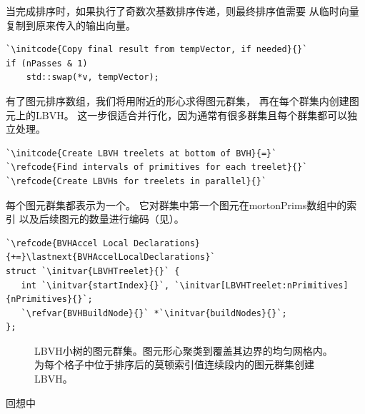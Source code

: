当完成排序时，如果执行了奇数次基数排序传递，则最终排序值需要
从临时向量复制到原来传入的输出向量。
\begin{lstlisting}
`\initcode{Copy final result from tempVector, if needed}{}`
if (nPasses & 1)
    std::swap(*v, tempVector);
\end{lstlisting}

有了图元排序数组，我们将用附近的形心求得图元群集，
再在每个群集内创建图元上的LBVH。
这一步很适合并行化，因为通常有很多群集且每个群集都可以独立处理。
\begin{lstlisting}
`\initcode{Create LBVH treelets at bottom of BVH}{=}`
`\refcode{Find intervals of primitives for each treelet}{}`
`\refcode{Create LBVHs for treelets in parallel}{}`
\end{lstlisting}

每个图元群集都表示为一个。
它对群集中第一个图元在{\ttfamily mortonPrims}数组中的索引
以及后续图元的数量进行编码（见）。
\begin{lstlisting}
`\refcode{BVHAccel Local Declarations}{+=}\lastnext{BVHAccelLocalDeclarations}`
struct `\initvar{LBVHTreelet}{}` {
   int `\initvar{startIndex}{}`, `\initvar[LBVHTreelet:nPrimitives]{nPrimitives}{}`;
   `\refvar{BVHBuildNode}{}` *`\initvar{buildNodes}{}`;
};
\end{lstlisting}

\begin{figure}[htbp]
    \centering
    \caption{LBVH小树的图元群集。图元形心聚类到覆盖其边界的均匀网格内。
        为每个格子中位于排序后的莫顿索引值连续段内的图元群集创建LBVH。}
    \label{fig:4.12}
\end{figure}

回想中